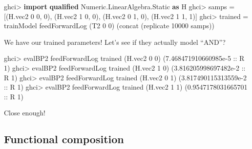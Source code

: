 \documentclass[]{article}
\newenvironment{Shaded}{}{}
\newcommand{\DataTypeTok}[1]{\textcolor[rgb]{0.56,0.13,0.00}{#1}}
\newcommand{\DecValTok}[1]{\textcolor[rgb]{0.25,0.63,0.44}{#1}}
\newcommand{\FloatTok}[1]{\textcolor[rgb]{0.25,0.63,0.44}{#1}}
\newcommand{\FunctionTok}[1]{\textcolor[rgb]{0.02,0.16,0.49}{#1}}
\newcommand{\KeywordTok}[1]{\textcolor[rgb]{0.00,0.44,0.13}{\textbf{#1}}}
\newcommand{\NormalTok}[1]{#1}
\newcommand{\OtherTok}[1]{\textcolor[rgb]{0.00,0.44,0.13}{#1}}
\begin{document}
\begin{Shaded}
\begin{Highlighting}[]
\NormalTok{ghci}\FunctionTok{>} \KeywordTok{import} \KeywordTok{qualified} \DataTypeTok{Numeric.LinearAlgebra.Static} \KeywordTok{as} \DataTypeTok{H}
\NormalTok{ghci}\FunctionTok{>}\NormalTok{ samps }\FunctionTok{=}\NormalTok{ [(H.vec2 }\DecValTok{0} \DecValTok{0}\NormalTok{, }\DecValTok{0}\NormalTok{), (H.vec2 }\DecValTok{1} \DecValTok{0}\NormalTok{, }\DecValTok{0}\NormalTok{), (H.vec2 }\DecValTok{0} \DecValTok{1}\NormalTok{, }\DecValTok{0}\NormalTok{), (H.vec2 }\DecValTok{1} \DecValTok{1}\NormalTok{, }\DecValTok{1}\NormalTok{)]}
\NormalTok{ghci}\FunctionTok{>}\NormalTok{ trained }\FunctionTok{=}\NormalTok{ trainModel feedForwardLog (}\DataTypeTok{T2} \DecValTok{0} \DecValTok{0}\NormalTok{) (concat (replicate }\DecValTok{10000}\NormalTok{ samps))}
\end{Highlighting}
\end{Shaded}

We have our trained parameters! Let's see if they actually model ``AND''?

\begin{Shaded}
\begin{Highlighting}[]
\NormalTok{ghci}\FunctionTok{>}\NormalTok{ evalBP2 feedForwardLog trained (H.vec2 }\DecValTok{0} \DecValTok{0}\NormalTok{)}
\NormalTok{(}\FloatTok{7.468471910660985e-5}\OtherTok{ ::} \DataTypeTok{R} \DecValTok{1}\NormalTok{)}
\NormalTok{ghci}\FunctionTok{>}\NormalTok{ evalBP2 feedForwardLog trained (H.vec2 }\DecValTok{1} \DecValTok{0}\NormalTok{)}
\NormalTok{(}\FloatTok{3.816205998697482e-2}\OtherTok{ ::} \DataTypeTok{R} \DecValTok{1}\NormalTok{)}
\NormalTok{ghci}\FunctionTok{>}\NormalTok{ evalBP2 feedForwardLog trained (H.vec2 }\DecValTok{0} \DecValTok{1}\NormalTok{)}
\NormalTok{(}\FloatTok{3.817490115313559e-2}\OtherTok{ ::} \DataTypeTok{R} \DecValTok{1}\NormalTok{)}
\NormalTok{ghci}\FunctionTok{>}\NormalTok{ evalBP2 feedForwardLog trained (H.vec2 }\DecValTok{1} \DecValTok{1}\NormalTok{)}
\NormalTok{(}\FloatTok{0.9547178031665701}\OtherTok{ ::} \DataTypeTok{R} \DecValTok{1}\NormalTok{)}
\end{Highlighting}
\end{Shaded}

Close enough!

\hypertarget{functional-composition}{%
\subsection{Functional composition}\label{functional-composition}}
\end{document}
